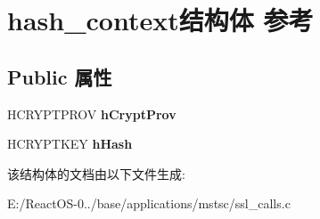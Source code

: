 \hypertarget{structhash__context}{}\section{hash\+\_\+context结构体 参考}
\label{structhash__context}
\subsection*{Public 属性}
\begin{DoxyCompactItemize}
\item 
\mbox{\label{structhash__context_a24c4497f0634ea0cb6ee5e41d6213e3e}} 
H\+C\+R\+Y\+P\+T\+P\+R\+OV {\bfseries h\+Crypt\+Prov}
\item 
\mbox{\label{structhash__context_a603e2cd0204b431e838edb6883b9fcd0}} 
H\+C\+R\+Y\+P\+T\+K\+EY {\bfseries h\+Hash}
\end{DoxyCompactItemize}


该结构体的文档由以下文件生成\+:\begin{DoxyCompactItemize}
\item 
E\+:/\+React\+O\+S-\/0../base/applications/mstsc/ssl\+\_\+calls.\+c\end{DoxyCompactItemize}
